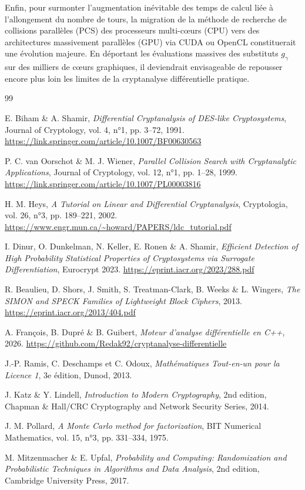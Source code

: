 \documentclass[a4paper,11pt]{article}
\begin{document}
Enfin, pour surmonter l'augmentation inévitable des temps de calcul liée à l'allongement du nombre de tours, la migration de la méthode de recherche de collisions parallèles (PCS) des processeurs multi-cœurs (CPU) vers des architectures massivement parallèles (GPU) via CUDA ou OpenCL constituerait une évolution majeure. En déportant les évaluations massives des substituts $g_{\gamma}$ sur des milliers de cœurs graphiques, il deviendrait envisageable de repousser encore plus loin les limites de la cryptanalyse différentielle pratique.

\newpage
\begin{thebibliography}{99}

    E. Biham \& A. Shamir,
    \textit{Differential Cryptanalysis of DES-like Cryptosystems},
    Journal of Cryptology, vol. 4, n°1, pp. 3--72, 1991.
    \url{https://link.springer.com/article/10.1007/BF00630563}

    P. C. van Oorschot \& M. J. Wiener,
    \textit{Parallel Collision Search with Cryptanalytic Applications},
    Journal of Cryptology, vol. 12, n°1, pp. 1--28, 1999.
    \url{https://link.springer.com/article/10.1007/PL00003816}

    H. M. Heys,
    \textit{A Tutorial on Linear and Differential Cryptanalysis},
    Cryptologia, vol. 26, n°3, pp. 189--221, 2002.
    \url{https://www.engr.mun.ca/~howard/PAPERS/ldc_tutorial.pdf}

    I. Dinur, O. Dunkelman, N. Keller, E. Ronen \& A. Shamir,
    \textit{Efficient Detection of High Probability Statistical Properties of Cryptosystems via Surrogate Differentiation},
    Eurocrypt 2023.
    \url{https://eprint.iacr.org/2023/288.pdf}

    R. Beaulieu, D. Shors, J. Smith, S. Treatman-Clark, B. Weeks \& L. Wingers,
    \textit{The SIMON and SPECK Families of Lightweight Block Ciphers}, 2013.
    \url{https://eprint.iacr.org/2013/404.pdf}

    A. François, B. Dupré \& B. Guibert,
    \textit{Moteur d'analyse différentielle en C++}, 2026.
    \url{https://github.com/Redak92/cryptanalyse-differentielle}

    J.-P. Ramis, C. Deschamps et C. Odoux,
    \textit{Mathématiques Tout-en-un pour la Licence 1},
    3e édition, Dunod, 2013.

    J. Katz \& Y. Lindell,
    \textit{Introduction to Modern Cryptography},
    2nd edition, Chapman \& Hall/CRC Cryptography and Network Security Series, 2014.

    J. M. Pollard,
    \textit{A Monte Carlo method for factorization},
    BIT Numerical Mathematics, vol. 15, n°3, pp. 331--334, 1975.

    M. Mitzenmacher \& E. Upfal,
    \textit{Probability and Computing: Randomization and Probabilistic Techniques in Algorithms and Data Analysis},
    2nd edition, Cambridge University Press, 2017.

\end{thebibliography}
\end{document}
